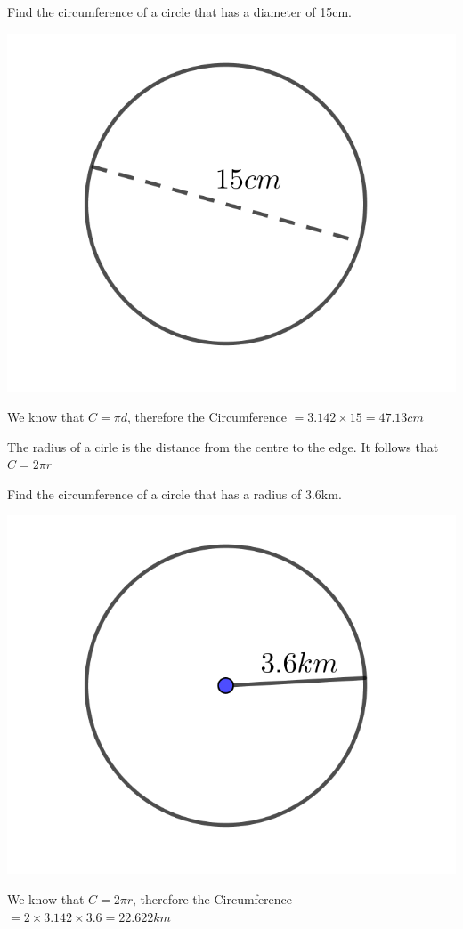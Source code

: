 \begin{exmp}
Find the circumference of a circle that has a diameter of 15cm.

\bigskip

\includegraphics{./Images/Measurement/circumferenceEg1.png}

\bigskip

We know that $C=\pi d$, therefore the Circumference $=3.142 \times 15=47.13cm$
\end{exmp}

The radius of a cirle is the distance from the centre to the edge.  It follows that $C=2\pi r$
\begin{exmp}
Find the circumference of a circle that has a radius of 3.6km.

\bigskip

\includegraphics{./Images/Measurement/circumferenceEg2.png}

\bigskip

We know that $C=2\pi r$, therefore the Circumference $=2 \times 3.142 \times 3.6=22.622km$
\end{exmp}
